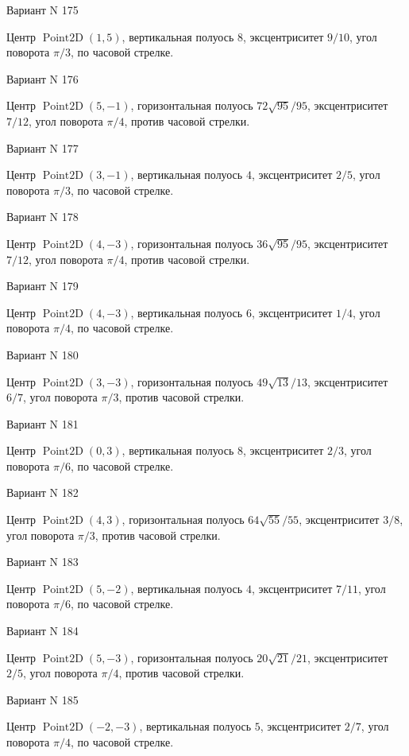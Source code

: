 \documentclass[11pt]{report}
\begin{document}
Вариант N 175

Центр $\operatorname{Point2D}\left(1, 5\right)$, вертикальная полуось $8$, эксцентриситет $9 / 10$, угол поворота $\pi / 3$, по часовой стрелке.

Вариант N 176

Центр $\operatorname{Point2D}\left(5, -1\right)$, горизонтальная полуось $72 \sqrt{95} / 95$, эксцентриситет $7 / 12$, угол поворота $\pi / 4$, против часовой стрелки.

Вариант N 177

Центр $\operatorname{Point2D}\left(3, -1\right)$, вертикальная полуось $4$, эксцентриситет $2 / 5$, угол поворота $\pi / 3$, по часовой стрелке.

Вариант N 178

Центр $\operatorname{Point2D}\left(4, -3\right)$, горизонтальная полуось $36 \sqrt{95} / 95$, эксцентриситет $7 / 12$, угол поворота $\pi / 4$, против часовой стрелки.

Вариант N 179

Центр $\operatorname{Point2D}\left(4, -3\right)$, вертикальная полуось $6$, эксцентриситет $1 / 4$, угол поворота $\pi / 4$, по часовой стрелке.

Вариант N 180

Центр $\operatorname{Point2D}\left(3, -3\right)$, горизонтальная полуось $49 \sqrt{13} / 13$, эксцентриситет $6 / 7$, угол поворота $\pi / 3$, против часовой стрелки.

Вариант N 181

Центр $\operatorname{Point2D}\left(0, 3\right)$, вертикальная полуось $8$, эксцентриситет $2 / 3$, угол поворота $\pi / 6$, по часовой стрелке.

Вариант N 182

Центр $\operatorname{Point2D}\left(4, 3\right)$, горизонтальная полуось $64 \sqrt{55} / 55$, эксцентриситет $3 / 8$, угол поворота $\pi / 3$, против часовой стрелки.

Вариант N 183

Центр $\operatorname{Point2D}\left(5, -2\right)$, вертикальная полуось $4$, эксцентриситет $7 / 11$, угол поворота $\pi / 6$, по часовой стрелке.

Вариант N 184

Центр $\operatorname{Point2D}\left(5, -3\right)$, горизонтальная полуось $20 \sqrt{21} / 21$, эксцентриситет $2 / 5$, угол поворота $\pi / 4$, против часовой стрелки.

Вариант N 185

Центр $\operatorname{Point2D}\left(-2, -3\right)$, вертикальная полуось $5$, эксцентриситет $2 / 7$, угол поворота $\pi / 4$, по часовой стрелке.
\end{document}
